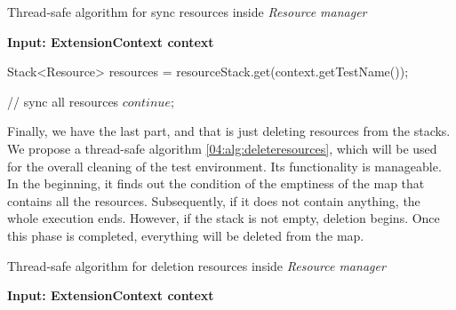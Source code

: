 \begin{algorithm}[H]
    \label{04:alg:syncresources}
    \caption{Thread-safe algorithm for sync resources inside \emph{Resource manager}}
    \hspace*{\algorithmicindent} \textbf{Input: ExtensionContext context}
    \begin{algorithmic}[1]
        \State Stack<Resource> resources = resourceStack.get(context.getTestName());
        \State

        \State // sync all resources
            \State $continue;$
        \EndIf

        \State

        \EndForEach
    \end{algorithmic}
\end{algorithm}

Finally, we have the last part, and that is just deleting resources from the stacks. We propose a thread-safe algorithm \ref{04:alg:deleteresources}, which will be used for the overall cleaning of the test environment. Its functionality is manageable. In the beginning, it finds out the condition of the emptiness of the map that contains all the resources. Subsequently, if it does not contain anything, the whole execution ends. However, if the stack is not empty, deletion begins. Once this phase is completed, everything will be deleted from the map.

\begin{algorithm}[H]
    \label{04:alg:deleteresources}
    \caption{Thread-safe algorithm for deletion resources inside \emph{Resource manager}}
    \hspace*{\algorithmicindent} \textbf{Input: ExtensionContext context}
    \begin{algorithmic}[1]

        \If{$\Psi$}
        \EndIf
        \While {$!\Psi$}
        \EndWhile

    \end{algorithmic}
\end{algorithm}

